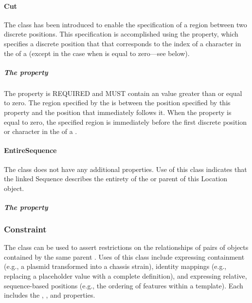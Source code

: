 \paragraph{Cut}
\label{sec:Cut}
The  class has been introduced to enable the specification of a region between two discrete positions.
This specification is accomplished using the  property, which specifies a discrete position that that corresponds to the index of a character in the   of a  (except in the case when  is equal to zero---see below).

\subparagraph{The  property}
\label{sec:at}
The  property is REQUIRED and MUST contain an  value greater than or equal to zero. The region specified by the  is between the position specified by this property and the position that immediately follows it. When the  property is equal to zero, the specified region is immediately before the first discrete position or character in the   of a .


\paragraph{EntireSequence}
\label{sec:EntireSequence}
The  class does not have any additional properties. Use of this class indicates that the linked Sequence describes the entirety of the  or  parent of this Location object.

\subparagraph{The  property}
\label{sec:order}


\subsubsection{Constraint}
\label{sec:Constraint}
The  class can be used to assert restrictions on the relationships of pairs of  objects contained by the same parent .
Uses of this class include expressing containment (e.g., a plasmid transformed into a chassis strain), identity mappings (e.g., replacing a placeholder value with a complete definition), and expressing relative, sequence-based positions (e.g., the ordering of features within a template).
Each  includes the , , and  properties.

